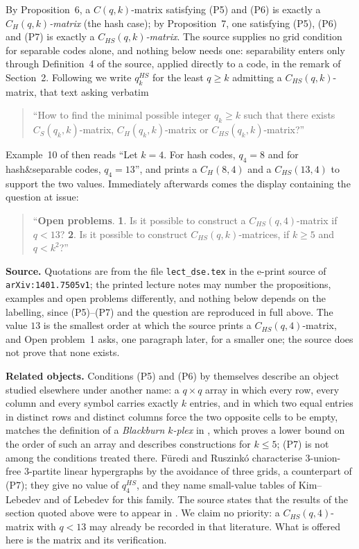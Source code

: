 \documentclass[11pt]{amsart}
\theoremstyle{definition}
\theoremstyle{remark}
\begin{document}
By Proposition~6, a $C(q,k)$-matrix satisfying (P5) and (P6) is exactly a
\emph{$C_H(q,k)$-matrix} (the hash case); by Proposition~7, one satisfying (P5),
(P6) and (P7) is exactly a \emph{$C_{HS}(q,k)$-matrix}. The source supplies no
grid condition for separable codes alone, and nothing below needs one:
separability enters only through Definition~4 of the source, applied directly to
a code, in the remark of Section~2. Following \cite{Dya} we write
$q_k^{HS}$ for the least $q\ge k$ admitting a $C_{HS}(q,k)$-matrix, that text
asking verbatim
\begin{quote}
``How to find the minimal possible integer $q_k\ge k$ such that there exists
$C_S(q_k,k)$-matrix, $C_H(q_k,k)$-matrix or $C_{HS}(q_k,k)$-matrix?''
\end{quote}
Example~10 of \cite{Dya} then reads ``Let $k=4$. For hash codes, $q_4=8$ and
for hash\&separable codes, $q_4=13$'', and prints a $C_H(8,4)$ and a
$C_{HS}(13,4)$ to support the two values. Immediately afterwards comes the
display containing the question at issue:
\begin{quote}
``\textbf{Open problems}. \textbf{1}. Is it possible to construct a
$C_{HS}(q,4)$-matrix if $q<13$? \textbf{2}. Is it possible to construct
$C_{HS}(q,k)$-matrices, if $k\ge5$ and $q<k^2$?''
\end{quote}

\medskip
\noindent\textbf{Source.}
Quotations are from the file \texttt{lect\_dse.tex} in the e-print source of
\texttt{arXiv:1401.7505v1}; the printed lecture notes may number the
propositions, examples and open problems differently, and nothing below depends
on the labelling, since (P5)--(P7) and the question are reproduced in full
above. The value $13$ is the smallest order at which the source prints a
$C_{HS}(q,4)$-matrix, and Open problem~1 asks, one paragraph later, for a
smaller one; the source does not prove that none exists.

\medskip
\noindent\textbf{Related objects.}
Conditions (P5) and (P6) by themselves describe an object studied elsewhere
under another name: a $q\times q$ array in which every row, every column and
every symbol carries exactly $k$ entries, and in which two equal entries in
distinct rows and distinct columns force the two opposite cells to be empty,
matches the definition of a \emph{Blackburn $k$-plex} in \cite{Sto}, which
proves a lower bound on the order of such an array and describes constructions
for $k\le5$; (P7) is not among the conditions treated there. F\"uredi and
Ruszink\'o \cite{FR} characterise $3$-union-free $3$-partite linear hypergraphs
by the avoidance of three grids, a counterpart of (P7); they give no value of
$q_4^{HS}$, and they name small-value tables of Kim--Lebedev and of Lebedev for
this family. The source states that the results of the section quoted above were
to appear in \cite{DyaRykov}. We claim no priority: a $C_{HS}(q,4)$-matrix with
$q<13$ may already be recorded in that literature. What is offered here is the
matrix and its verification.
\end{document}
